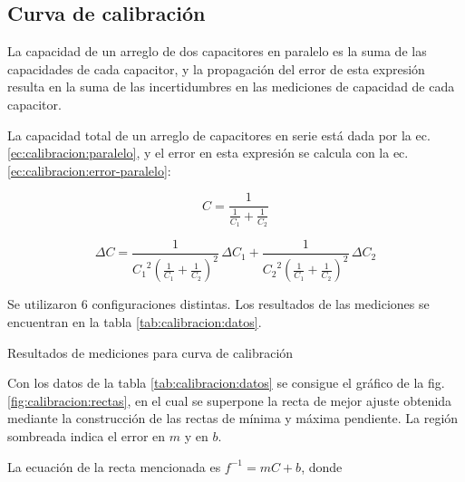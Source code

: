 \subsection{Curva de calibración}
\label{sec:calibracion}

La capacidad de un arreglo de dos capacitores en paralelo es la suma de las
capacidades de cada capacitor, y la propagación del error de esta expresión 
resulta en la suma de las incertidumbres en las mediciones de capacidad de cada
capacitor.

La capacidad total de un arreglo de capacitores en serie está dada por la ec.
\ref{ec:calibracion:paralelo}, y el error en esta expresión se calcula con la
ec. \ref{ec:calibracion:error-paralelo}:

\begin{equation}
    \label{ec:calibracion:paralelo}
    C = \frac{1}{\frac{1}{C_1} + \frac{1}{C_2}}
\end{equation}

\begin{equation}
    \label{ec:calibracion:error-paralelo}
    \Delta C =
    \frac{1}{{C_1}^2 \left( \frac{1}{C_1} + \frac{1}{C_2} \right)^2} \, \Delta C_1 + 
    \frac{1}{{C_2}^2 \left( \frac{1}{C_1} + \frac{1}{C_2} \right)^2} \, \Delta C_2
\end{equation}

Se utilizaron 6 configuraciones distintas. Los resultados de las mediciones se
encuentran en la tabla \ref{tab:calibracion:datos}.

\begin{table}[H]
    \centering
    \caption{Resultados de mediciones para curva de calibración}
    \label{tab:calibracion:datos}
\end{table}

Con los datos de la tabla \ref{tab:calibracion:datos} se consigue el gráfico
de la fig. \ref{fig:calibracion:rectas}, en el cual se superpone la recta
de mejor ajuste obtenida mediante la construcción de las rectas de mínima y 
máxima pendiente. La región sombreada indica el error en $m$ y en $b$.

La ecuación de la recta mencionada es $f^{-1} = mC + b$,
donde 

